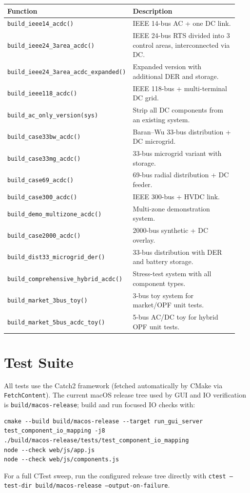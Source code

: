 \begin{longtable}{L{0.44\linewidth}L{0.50\linewidth}}
\toprule
Function & Description \\
\midrule
\endhead
\texttt{build\_ieee14\_acdc()} & IEEE 14-bus AC + one DC link. \\
\texttt{build\_ieee24\_3area\_acdc()} & IEEE 24-bus RTS divided into 3 control areas, interconnected via DC. \\
\texttt{build\_ieee24\_3area\_acdc\_expanded()} & Expanded version with additional DER and storage. \\
\texttt{build\_ieee118\_acdc()} & IEEE 118-bus + multi-terminal DC grid. \\
\texttt{build\_ac\_only\_version(sys)} & Strip all DC components from an existing system. \\
\texttt{build\_case33bw\_acdc()} & Baran--Wu 33-bus distribution + DC microgrid. \\
\texttt{build\_case33mg\_acdc()} & 33-bus microgrid variant with storage. \\
\texttt{build\_case69\_acdc()} & 69-bus radial distribution + DC feeder. \\
\texttt{build\_case300\_acdc()} & IEEE 300-bus + HVDC link. \\
\texttt{build\_demo\_multizone\_acdc()} & Multi-zone demonstration system. \\
\texttt{build\_case2000\_acdc()} & 2000-bus synthetic + DC overlay. \\
\texttt{build\_dist33\_microgrid\_der()} & 33-bus distribution with DER and battery storage. \\
\texttt{build\_comprehensive\_hybrid\_acdc()} & Stress-test system with all component types. \\
\texttt{build\_market\_3bus\_toy()} & 3-bus toy system for market/OPF unit tests. \\
\texttt{build\_market\_5bus\_acdc\_toy()} & 5-bus AC/DC toy for hybrid OPF unit tests. \\
\bottomrule
\end{longtable}

\section{Test Suite}
\label{sec:tests}

All tests use the Catch2 framework (fetched automatically by CMake via
\texttt{FetchContent}).  The current macOS release tree used by GUI and IO
verification is \texttt{build/macos-release}; build and run focused IO checks
with:
\begin{verbatim}
cmake --build build/macos-release --target run_gui_server test_component_io_mapping -j8
./build/macos-release/tests/test_component_io_mapping
node --check web/js/app.js
node --check web/js/components.js
\end{verbatim}
For a full CTest sweep, run the configured release tree directly with
\texttt{ctest --test-dir build/macos-release --output-on-failure}.

